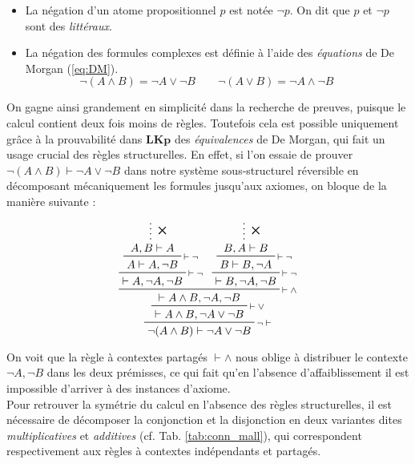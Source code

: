 \documentclass[12pt]{report}
\newcommand{\seq}{\vdash}
\newcommand{\irule}[1]{\footnotesize$#1$}
\newcommand{\iruleL}[1]{\irule{{#1}\seq}}
\newcommand{\iruleR}[1]{\irule{\seq{#1}}}
\begin{document}
\begin{itemize}
    \item La négation d'un atome propositionnel $p$ est notée $\neg p$. On dit que $p$ et $\neg p$ sont des \emph{littéraux}.
    \item La négation des formules complexes est définie à l'aide des \emph{équations} de De Morgan (\ref{eq:DM}).
        \begin{equation} \label{eq:DM}
            \neg (A \land B) = \neg A \lor \neg B \qquad \neg (A \lor B) = \neg A \land \neg B \qquad
        \end{equation}
\end{itemize}

On gagne ainsi grandement en simplicité dans la recherche de preuves, puisque le calcul contient deux fois moins de règles. Toutefois cela est possible uniquement grâce à la prouvabilité dans $\mathbf{LKp}$ des \emph{équivalences} de De Morgan, qui fait un usage crucial des règles structurelles. En effet, si l'on essaie de prouver $\neg (A \land B) \seq \neg A \lor \neg B$ dans notre système sous-structurel réversible en décomposant mécaniquement les formules jusqu'aux axiomes, on bloque de la manière suivante :

\begin{displaymath}
    \prftree[r]{\iruleL{\neg}}
        {\prftree[r]{\iruleR{\lor}}
            {\prftree[r]{\iruleR{\land}}
                {\prftree[r]{\iruleR{\neg}}
                    {\prftree[r]{\iruleR{\neg}}
                        {\prfsummary[\ding{53}]{A,B \seq A}}
                        {A \seq A,\neg B}}
                    {\seq A,\neg A,\neg B}}
                {\prftree[r]{\iruleR{\neg}}
                    {\prftree[r]{\iruleR{\neg}}
                        {\prfsummary[\ding{53}]{B,A \seq B}}
                        {B \seq B,\neg A}}
                    {\seq B,\neg A,\neg B}}
                {\seq A \land B,\neg A,\neg B}}
            {\seq A \land B,\neg A \lor \neg B}}
        {\neg (A \land B) \seq \neg A \lor \neg B}
\end{displaymath}

On voit que la règle à contextes partagés {\iruleR{\land}} nous oblige à distribuer le contexte $\neg A,\neg B$ dans les deux prémisses, ce qui fait qu'en l'absence d'affaiblissement il est impossible d'arriver à des instances d'axiome.\\

Pour retrouver la symétrie du calcul en l'absence des règles structurelles, il est nécessaire de décomposer la conjonction et la disjonction en deux variantes dites \emph{multiplicatives} et \emph{additives} (cf. Tab. \ref{tab:conn_mall}), qui correspondent respectivement aux règles à contextes indépendants et partagés.
\end{document}
